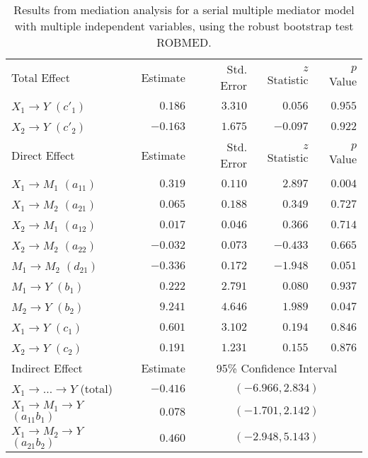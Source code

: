 \documentclass{article}\usepackage[]{graphicx}\usepackage[]{xcolor}
\begin{document}
\begin{table}[h!]
\caption{Results from mediation analysis for a serial multiple mediator model with multiple independent variables, using the robust bootstrap test ROBMED.}
\begin{center}
\begin{tabular}{lrrrr}
\hline\noalign{\smallskip}
Total Effect & Estimate & Std. Error & $z$ Statistic & $p$ Value \\ 
\noalign{\smallskip}\hline\noalign{\smallskip}
$X_{1} \rightarrow Y$ $(c'_{1})$ & $ 0.186$ & $ 3.310$ & $ 0.056$ & $ 0.955$ \\ 
$X_{2} \rightarrow Y$ $(c'_{2})$ & $-0.163$ & $ 1.675$ & $-0.097$ & $ 0.922$ \\ 
\noalign{\smallskip}\hline\noalign{\smallskip}
Direct Effect & Estimate & Std. Error & $z$ Statistic & $p$ Value \\ 
\noalign{\smallskip}\hline\noalign{\smallskip}
$X_{1} \rightarrow M_{1}$ $(a_{11})$ & $ 0.319$ & $ 0.110$ & $ 2.897$ & $ 0.004$ \\ 
$X_{1} \rightarrow M_{2}$ $(a_{21})$ & $ 0.065$ & $ 0.188$ & $ 0.349$ & $ 0.727$ \\ 
$X_{2} \rightarrow M_{1}$ $(a_{12})$ & $ 0.017$ & $ 0.046$ & $ 0.366$ & $ 0.714$ \\ 
$X_{2} \rightarrow M_{2}$ $(a_{22})$ & $-0.032$ & $ 0.073$ & $-0.433$ & $ 0.665$ \\ 
$M_{1} \rightarrow M_{2}$ $(d_{21})$ & $-0.336$ & $ 0.172$ & $-1.948$ & $ 0.051$ \\ 
$M_{1} \rightarrow Y$ $(b_{1})$ & $ 0.222$ & $ 2.791$ & $ 0.080$ & $ 0.937$ \\ 
$M_{2} \rightarrow Y$ $(b_{2})$ & $ 9.241$ & $ 4.646$ & $ 1.989$ & $ 0.047$ \\ 
$X_{1} \rightarrow Y$ $(c_{1})$ & $ 0.601$ & $ 3.102$ & $ 0.194$ & $ 0.846$ \\ 
$X_{2} \rightarrow Y$ $(c_{2})$ & $ 0.191$ & $ 1.231$ & $ 0.155$ & $ 0.876$ \\ 
\noalign{\smallskip}\hline\noalign{\smallskip}
Indirect Effect & Estimate & \multicolumn{3}{c}{95\% Confidence Interval} \\ 
\noalign{\smallskip}\hline\noalign{\smallskip}
$X_{1} \rightarrow  \ldots  \rightarrow Y$ (total) & $-0.416$ & \multicolumn{3}{c}{$(-6.966,  2.834)$} \\ 
$X_{1} \rightarrow M_{1} \rightarrow Y$ $(a_{11}b_{1})$ & $ 0.078$ & \multicolumn{3}{c}{$(-1.701,  2.142)$} \\ 
$X_{1} \rightarrow M_{2} \rightarrow Y$ $(a_{21}b_{2})$ & $ 0.460$ & \multicolumn{3}{c}{$(-2.948,  5.143)$} \\ 

\end{tabular}
\end{center}
\end{table}
\end{document}
